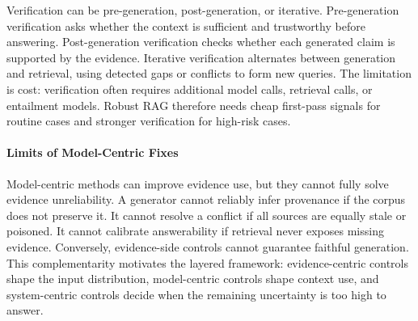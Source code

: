 Verification can be pre-generation, post-generation, or iterative. Pre-generation verification asks whether the context is sufficient and trustworthy before answering. Post-generation verification checks whether each generated claim is supported by the evidence. Iterative verification alternates between generation and retrieval, using detected gaps or conflicts to form new queries. The limitation is cost: verification often requires additional model calls, retrieval calls, or entailment models. Robust RAG therefore needs cheap first-pass signals for routine cases and stronger verification for high-risk cases.

\paragraph{Limits of Model-Centric Fixes}

Model-centric methods can improve evidence use, but they cannot fully solve evidence unreliability. A generator cannot reliably infer provenance if the corpus does not preserve it. It cannot resolve a conflict if all sources are equally stale or poisoned. It cannot calibrate answerability if retrieval never exposes missing evidence. Conversely, evidence-side controls cannot guarantee faithful generation. This complementarity motivates the layered framework: evidence-centric controls shape the input distribution, model-centric controls shape context use, and system-centric controls decide when the remaining uncertainty is too high to answer.
